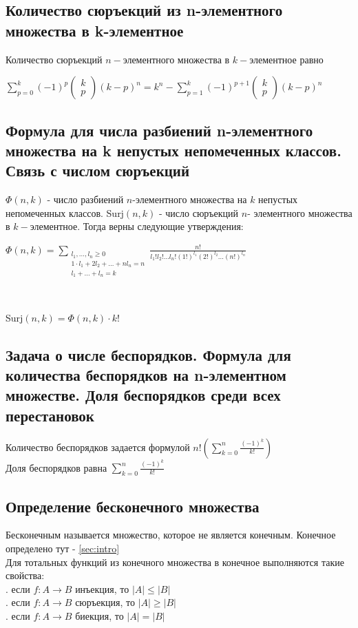 \documentclass[a4paper]{article}
\begin{document}
\subsection{Количество сюръекций из n-элементного множества в k-элементное}
Количество сюръекций $n-$элементного множества в $k-$элементное равно\\[2mm]
\centerline{$\sum\limits_{p=0}^k (-1)^p\begin{pmatrix}
    k\\
    p
\end{pmatrix}(k-p)^n=k^n-\sum\limits_{p=1}^k (-1)^{p+1}\begin{pmatrix}
    k\\
    p
\end{pmatrix}(k-p)^n$}
\subsection{Формула для числа разбиений n-элементного множества на k непустых непомеченных классов. Связь с числом сюръекций}
$\Phi(n,k)$ - число разбиений $n$-элементного множества на $k$ непустых непомеченных классов. Surj$(n,k)$ - число сюръекций $n$-
элементного множества в $k-$элементное. Тогда верны следующие утверждения:\\[2mm]
\centerline{$\Phi(n,k)=\sum\limits_{\substack{l_1,\ldots,l_n\geqslant0\\1\cdot l_1+2l_2+\ldots+nl_n=n\\l_1+\ldots+l_n=k}} \frac{n!}{l_1!l_2!\ldots l_n!(1!)^{l_1}(2!)^{l_2}\ldots(n!)^{l_n}}$}\\[2mm]
\centerline{Surj$(n,k)=\Phi(n,k)\cdot k!$}
\subsection{Задача о числе беспорядков. Формула для количества беспорядков на n-элементном множестве. Доля беспорядков среди всех перестановок}
Количество беспорядков задается формулой $n!\left(\sum\limits_{k=0}^n \frac{(-1)^k}{k!}\right)$\\[2mm]
Доля беспорядков равна $\sum\limits_{k=0}^n \frac{(-1)^k}{k!}$
\subsection{Определение бесконечного множества}
Бесконечным называется множество, которое не является конечным. Конечное определено тут - \ref{sec:intro}\\[2mm]
Для тотальных функций из конечного множества в конечное выполняются такие свойства:\\[2mm]
. если $f: A\rightarrow B$ инъекция, то $|A|\leqslant|B|$\\[2mm]
. если $f: A\rightarrow B$ сюръекция, то $|A|\geqslant|B|$\\[2mm]
. если $f: A\rightarrow B$ биекция, то $|A|=|B|$\\[2mm]
\end{document}
